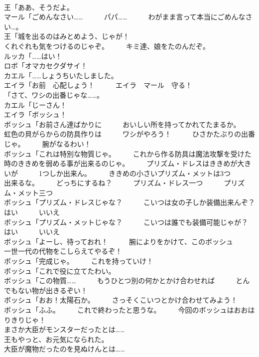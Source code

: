 \documentclass[8pt]{extreport}
\begin{document}
\begin{CJK}{UTF8}{min}
\\	王「ああ、そうだよ。	
\\	マール「ごめんなさい……　　　パパ……　　　わがまま言って本当にごめんなさい…。	
\\	王「城を出るのはみとめよう、じゃが！	
\\	くれぐれも気をつけるのじゃぞ。　　　キミ達、娘をたのんだぞ。	
\\	ルッカ「……はい！	
\\	ロボ「オマカセクダサイ！	
\\	カエル「……しょうちいたしました。	
\\	エイラ「お前　心配しょう！　　　エイラ　マール　守る！	
\\	「さて、ワシの出番じゃな……。	
\\	カエル「じーさん！	
\\	エイラ「ボッシュ！	
\\	ボッシュ「お前さん達ばかりに　　　おいしい所を持ってかれてたまるか。　　　虹色の貝がらからの防具作りは　　　ワシがやろう！　　　ひさかたぶりの出番じゃ。　　　腕がなるわい！	
\\	ボッシュ「これは特別な物質じゃ。　　　これから作る防具は魔法攻撃を受けた　　　時のききめを弱める事が出来るのじゃ。　　　プリズム・ドレスはききめが大きいが　　　1つしか出来ん。　　　ききめの小さいプリズム・メットは3つ　　　出来るな。　　　どっちにするね？　　　プリズム・ドレス一つ　　　プリズム・メット三つ	
\\	ボッシュ「プリズム・ドレスじゃな？　　　こいつは女の子しか装備出来んぞ？　　　はい　　　いいえ	
\\	ボッシュ「プリズム・メットじゃな？　　　こいつは誰でも装備可能じゃが？　　　はい　　　いいえ	
\\	ボッシュ「よーし、待っておれ！　　　腕によりをかけて、このボッシュ　　　一世一代の代物をこしらえてやるぞ！	
\\	ボッシュ「完成じゃ。　　　これを持っていけ！	
\\	ボッシュ「これで役に立てたわい。	
\\	ボッシュ「この物質……　　　もうひとつ別の何かとかけ合わせれば　　　とんでもない物が出きるぞい！	
\\	ボッシュ「おお！太陽石か。　　　さっそくこいつとかけ合わせてみよう！	
\\	ボッシュ「ふふ。　　　これで終わったと思うな。　　　今回のボッシュはおおはりきりじゃ！	
\\	まさか大臣がモンスターだったとは……	
\\	王もやっと、お元気になられた。	
\\	大臣が魔物だったのを見ぬけんとは……	

\end{CJK}
\end{document}
